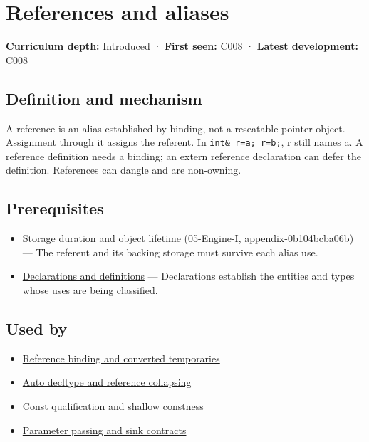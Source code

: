 \hypertarget{appendix-d6d562ca9fbb}{}
\section{References and aliases}\label{appendix-d6d562ca9fbb-references-and-aliases}

\textbf{Curriculum depth:} Introduced · \textbf{First seen:} C008 · \textbf{Latest development:} C008

\subsection{Definition and mechanism}\label{appendix-d6d562ca9fbb-definition-and-mechanism}

A reference is an alias established by binding, not a reseatable pointer object. Assignment through it assigns the referent. In \texttt{int\&\ r=a;\ r=b;}, r still names a. A reference definition needs a binding; an extern reference declaration can defer the definition. References can dangle and are non-owning.

\subsection{Prerequisites}\label{appendix-d6d562ca9fbb-prerequisites}

\begin{itemize}
\tightlist
\item
  \href{../05-Engine-I/main.pdf\#nameddest=appendix-0b104bcba06b}{Storage duration and object lifetime (05-Engine-I, appendix-0b104bcba06b)} --- The referent and its backing storage must survive each alias use.
\item
  \hyperref[appendix-2e4d494c2d94]{Declarations and definitions} --- Declarations establish the entities and types whose uses are being classified.
\end{itemize}

\subsection{Used by}\label{appendix-d6d562ca9fbb-used-by}

\begin{itemize}
\tightlist
\item
  \hyperref[appendix-37856d997bb0]{Reference binding and converted temporaries}
\item
  \hyperref[appendix-5d4252a42886]{Auto decltype and reference collapsing}
\item
  \hyperref[appendix-c25d60fed375]{Const qualification and shallow constness}
\item
  \hyperref[appendix-d5908f75721f]{Parameter passing and sink contracts}
\end{itemize}


